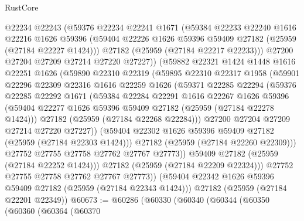 \begin{lexlean}{RustCore}
\begin{coremodule}
            @22234
            @22243
            (@59376
              @22234
              @22241
              @1671
              (@59384
                @22233
                @22240
                @1616
                @22216
                @1626
                @59396
                (@59404 @22226 @1626 @59396 @59409 @27182 (@25959 (@27184 @22227 @1424)))
                @27182
                (@25959 (@27184 @22217 @22233)))
              @27200
              @27204
              @27209
              @27214
              @27220
              @27227))
          (@59882
            @22321
            @1424
            @1448
            @1616
            @22251
            @1626
            (@59890
              @22310
              @22319
              (@59895
                @22310
                @22317
                @1958
                (@59901
                  @22296
                  @22309
                  @22316
                  @1616
                  @22259
                  @1626
                  (@59371
                    @22285
                    @22294
                    (@59376
                      @22285
                      @22292
                      @1671
                      (@59384
                        @22284
                        @22291
                        @1616
                        @22267
                        @1626
                        @59396
                        (@59404 @22277 @1626 @59396 @59409 @27182 (@25959 (@27184 @22278 @1424)))
                        @27182
                        (@25959 (@27184 @22268 @22284)))
                      @27200
                      @27204
                      @27209
                      @27214
                      @27220
                      @27227))
                  (@59404 @22302 @1626 @59396 @59409 @27182 (@25959 (@27184 @22303 @1424)))
                  @27182
                  (@25959 (@27184 @22260 @22309)))
                @27752
                @27755
                @27758
                @27762
                @27767
                @27773))
            @59409
            @27182
            (@25959 (@27184 @22252 @1424)))
          @27182
          (@25959 (@27184 @22209 @22324)))
        @27752
        @27755
        @27758
        @27762
        @27767
        @27773))
    (@59404 @22342 @1626 @59396 @59409 @27182 (@25959 (@27184 @22343 @1424)))
    @27182
    (@25959 (@27184 @22201 @22349))
@60673 := @60286
    (@60330
      (@60340
        (@60344
          (@60350
            (@60360
              (@60364
                (@60370

\end{coremodule}
\end{lexlean}
